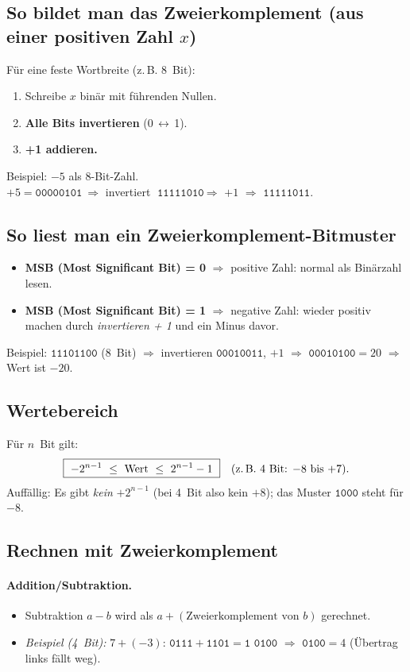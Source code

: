 \documentclass[../skript/main.tex]{subfiles}
\begin{document}
\subsection{So bildet man das Zweierkomplement (aus einer positiven Zahl \(x\))}
Für eine feste Wortbreite (z.\,B. 8~Bit):
\begin{enumerate}
	\item Schreibe \(x\) binär mit führenden Nullen.
	\item \textbf{Alle Bits invertieren} (0\,\(\leftrightarrow\)\,1).
	\item \textbf{+1 addieren.}
\end{enumerate}
Beispiel: \(-5\) als 8-Bit-Zahl. \\
\(+5 = \texttt{00000101}\ \Rightarrow\) invertiert \(\texttt{11111010}\ \Rightarrow\) \(+1\) \(\Rightarrow\) \(\boxed{\texttt{11111011}}\).

\subsection*{So liest man ein Zweierkomplement-Bitmuster}
\begin{itemize}
	\item \textbf{MSB (Most Significant Bit) = 0} \(\Rightarrow\) positive Zahl: normal als Binärzahl lesen.
	\item \textbf{MSB (Most Significant Bit) = 1} \(\Rightarrow\) negative Zahl: wieder positiv machen durch \emph{invertieren + 1} und ein Minus davor.
\end{itemize}
Beispiel: \(\texttt{11101100}\) (8~Bit) \(\Rightarrow\) invertieren \(\texttt{00010011}\), \(+1\) \(\Rightarrow\) \(\texttt{00010100} = 20\) \(\Rightarrow\) Wert ist \(-20\).

\subsection*{Wertebereich}
Für \(n\)~Bit gilt:
\[
\boxed{\ -2^{n-1}\ \le\ \text{Wert}\ \le\ 2^{n-1}-1\ }\quad
\text{(z.\,B. 4~Bit: \(-8\) bis \(+7\)).}
\]
Auffällig: Es gibt \emph{kein} \(+2^{n-1}\) (bei 4~Bit also kein \(+8\)); das Muster \(\texttt{1000}\) steht für \(-8\).

\subsection*{Rechnen mit Zweierkomplement}
\paragraph{Addition/Subtraktion.}
\begin{itemize}
	\item Subtraktion \(a-b\) wird als \(a + (\text{Zweierkomplement von } b)\) gerechnet.
	\item \emph{Beispiel (4~Bit):} \(7 + (-3)\): \(\texttt{0111} + \texttt{1101} = \texttt{1 0100}\) \(\Rightarrow\) \(\texttt{0100} = 4\) (Übertrag links fällt weg).
\end{itemize}
\end{document}
